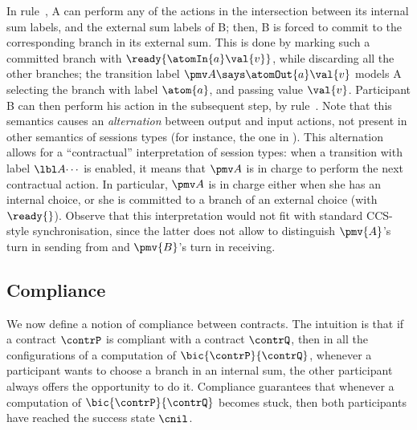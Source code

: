 In rule~\nrule{[IntExt]}, {\pmv A} can perform any of the actions in the intersection between its internal sum labels, and the external sum labels of {\pmv B}; then, {\pmv B} is forced to commit to the corresponding branch in its external sum.
This is done by marking such a committed branch with $\ready{\atomIn{a}\val{v}}$, while discarding all the other branches; the transition label ${\pmv A} \says \atomOut{a}\val{v}$ models {\pmv A} selecting the branch with label $\atom{a}$, and passing value $\val{v}$.
Participant {\pmv B} can then perform his action in the subsequent step, by rule~\nrule{[Rdy]}. 
%
Note that this semantics causes an \emph{alternation} between 
output and input actions,
not present in other semantics of sessions types 
(for instance, the one in \cite{Barbanera10ppdp}).
%
This alternation allows for a ``contractual'' interpretation 
of session types:
when a transition with label $\lbl A {\cdots}$ is enabled, 
it means that $\pmv A$ is in charge to perform the next contractual action. %
In particular, $\pmv A$ is in charge either when she has an internal choice, %
or she is committed to a branch of
an external choice (with $\ready{}$). %
Observe that this interpretation would not fit %
with standard CCS-style synchronisation, since the latter %
does not allow to distinguish $\pmv{A}$'s turn in sending
from %
and $\pmv{B}$'s turn in receiving.

\subsection{Compliance} \label{sec:contracts:compliance}
We now define a notion of compliance between contracts. The intuition is that if a contract $\contrP$ is compliant with a contract $\contrQ$, 
then in all the configurations of a computation of $\bic{\contrP}{\contrQ}$,
whenever a participant wants to choose a branch in an internal sum, 
the other participant always offers the opportunity to do it.
Compliance guarantees that %
whenever a computation of $\bic{\contrP}{\contrQ}$ becomes stuck,
then both participants have reached the success state $\cnil$.

